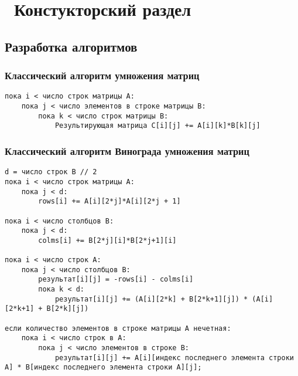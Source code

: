 \chapter{ Констукторский раздел}
\label{cha:design}
\section{ Разработка алгоритмов}

\subsection{ Классический алгоритм умножения матриц}

\begin{lstlisting}[caption={Pseudocode of classic matrix multiplication}]
пока i < число строк матрицы А:
	пока j < число элементов в строке матрицы B:
        пока k < число строк матрицы B:
		    Результирующая матрица C[i][j] += A[i][k]*B[k][j]
\end{lstlisting}	



\subsection{ Классический алгоритм Винограда умножения матриц}

\begin{lstlisting}[caption={Pseudocode of classic Winograd algorithm}]
d = число строк B // 2
пока i < число строк матрицы А:
	пока j < d:
		rows[i] += A[i][2*j]*A[i][2*j + 1]

пока i < число столбцов B:
	пока j < d:
		colms[i] += B[2*j][i]*B[2*j+1][i]

пока i < число строк A:
	пока j < число cтолбцов B:
        результат[i][j] = -rows[i] - colms[i]
        пока k < d:
            результат[i][j] += (A[i][2*k] + B[2*k+1][j]) * (A[i][2*k+1] + B[2*k][j])

если количество элементов в строке матрицы A нечетная:
    пока i < число строк в A:
        пока j < число элементов в строке B:
            результат[i][j] += A[i][индекс последнего элемента строки A] * B[индекс последнего элемента строки A][j];
\end{lstlisting}	



